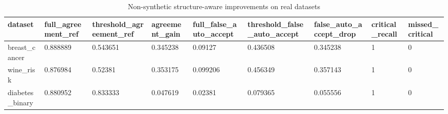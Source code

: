 \begin{table}[h]
\centering
\caption{Non-synthetic structure-aware improvements on real datasets}
\label{tab:non\_synthetic\_improvements}
\begin{tabular}{|l|l|l|l|l|l|l|l|l|}
\hline
dataset & full\_agreement\_ref & threshold\_agreement\_ref & agreement\_gain & full\_false\_auto\_accept & threshold\_false\_auto\_accept & false\_auto\_accept\_drop & critical\_recall & missed\_critical \\
\hline
breast\_cancer & 0.888889 & 0.543651 & 0.345238 & 0.09127 & 0.436508 & 0.345238 & 1 & 0 \\
\hline
wine\_risk & 0.876984 & 0.52381 & 0.353175 & 0.099206 & 0.456349 & 0.357143 & 1 & 0 \\
\hline
diabetes\_binary & 0.880952 & 0.833333 & 0.047619 & 0.02381 & 0.079365 & 0.055556 & 1 & 0 \\
\hline
\end{tabular}
\end{table}
